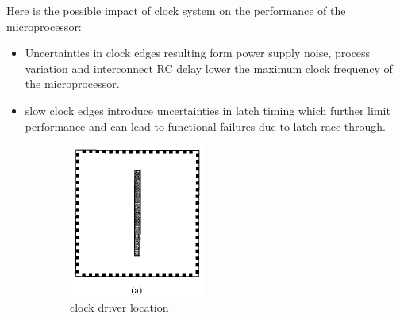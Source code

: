 \documentclass[11pt]{article}
\begin{document}
Here is the possible impact of clock system on the performance of the microprocessor:
\begin{itemize}
	\item Uncertainties in clock edges resulting form power supply noise, process variation and interconnect RC delay lower the maximum clock frequency of the microprocessor.
	\item slow clock edges introduce uncertainties in latch timing which further limit performance and can lead to functional failures due to latch race-through.
\end{itemize}
\begin{figure}[h]
	\centering
	\begin{subfigure}[b]{0.3\textwidth}
		\includegraphics[width=\textwidth]{21064_1.png}
		\caption{clock driver location}
	\end{subfigure}
	~ %
	\begin{subfigure}[b]{0.3\textwidth}

\end{subfigure}
\end{figure}
\end{document}
